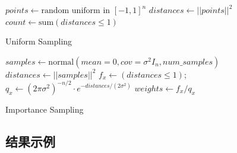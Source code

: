 \begin{algorithm}[H]
    \SetAlgoLined

    $points \gets \text{random uniform in } [-1, 1]^n$\;
    $distances \gets ||points||^2$\;
    $count \gets \text{sum}(distances \leq 1)$\;
    \;
    \caption{Uniform Sampling}
\end{algorithm}

\begin{algorithm}[H]
    \SetAlgoLined

    $samples \gets \text{normal}(mean=0, cov=\sigma^2I_n, num\_samples)$\;
    $distances \gets ||samples||^2$\;
    $f_x \gets (distances \leq 1)$; $q_x \gets (2\pi\sigma^2)^{-n/2} \cdot e^{-distances / (2\sigma^2)}$\;
    $weights \gets f_x / q_x$\;
    \;
    \caption{Importance Sampling}
\end{algorithm}
\subsection{结果示例}
